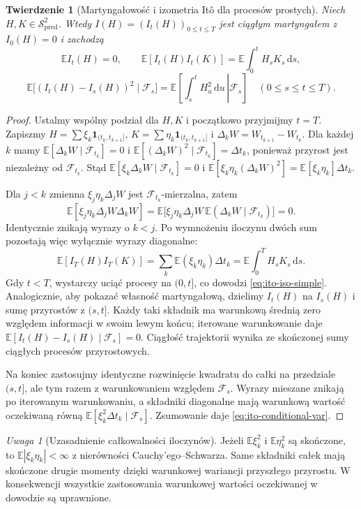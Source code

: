 \documentclass[11pt,a4paper,oneside]{report}
\numberwithin{equation}{chapter}
\theoremstyle{plain}
\newtheorem{twierdzenie}{Twierdzenie}[chapter]
\theoremstyle{definition}
\theoremstyle{remark}
\newtheorem{uwaga}{Uwaga}[chapter]
\newcommand{\E}{\mathbb{E}}
\newcommand{\calF}{\mathcal{F}}
\newcommand{\calS}{\mathcal{S}}
\newcommand{\ind}[1]{\mathbf{1}_{#1}}
\newcommand{\dd}{\mathrm{d}}
\begin{document}
\begin{twierdzenie}[Martyngałowość i izometria Itô dla procesów prostych]\label{thm:volIII:02:01}
\label{th:ito-simple-iso}
Niech $H,K\in\calS_{\mathrm{pred}}^2$. Wtedy
$I(H)=(I_t(H))_{0\le t\le T}$ jest ciągłym
martyngałem z $I_0(H)=0$ i zachodzą
\[
\E I_t(H)=0,\qquad
\E[I_t(H)I_t(K)]
=\E\int_0^tH_sK_s\,\dd s,
\tag{2.3}\label{eq:ito-iso-simple}
\]
\[
\E\big[(I_t(H)-I_s(H))^2\mid\calF_s\big]
=\E\left[\left.\int_s^tH_u^2\,\dd u\,\right|\calF_s\right]
\quad(0\le s\le t\le T).
\tag{2.4}\label{eq:ito-conditional-var}
\]
\end{twierdzenie}
\begin{proof}
Ustalmy wspólny podział dla $H,K$ i początkowo przyjmijmy
$t=T$. Zapiszmy $H=\sum\xi_k\ind{(t_k,t_{k+1}]}$,
$K=\sum\eta_k\ind{(t_k,t_{k+1}]}$ i
$\Delta_kW=W_{t_{k+1}}-W_{t_k}$.
Dla każdej $k$ mamy
$\E[\Delta_kW\mid\calF_{t_k}]=0$ i
$\E[(\Delta_kW)^2\mid\calF_{t_k}]=\Delta t_k$,
ponieważ przyrost jest niezależny od $\calF_{t_k}$.
Stąd
$\E[\xi_k\Delta_kW\mid\calF_{t_k}]=0$ i
$\E[\xi_k\eta_k(\Delta_kW)^2]=\E[\xi_k\eta_k]\Delta t_k$.

Dla $j<k$ zmienna $\xi_j\eta_k\Delta_jW$ jest
$\calF_{t_k}$-mierzalna, zatem
\[
\E[\xi_j\eta_k\Delta_jW\Delta_kW]
=\E\big[\xi_j\eta_k\Delta_jW\,
\E(\Delta_kW\mid\calF_{t_k})\big]=0.
\]
Identycznie znikają wyrazy o $k<j$.
Po wymnożeniu iloczynu dwóch sum pozostają więc
wyłącznie wyrazy diagonalne:
\[
\E[I_T(H)I_T(K)]
=\sum_k\E(\xi_k\eta_k)\Delta t_k
=\E\int_0^TH_sK_s\,\dd s.
\]
Gdy $t<T$, wystarczy uciąć procesy na $(0,t]$,
co dowodzi \eqref{eq:ito-iso-simple}. Analogicznie,
aby pokazać własność martyngałową, dzielimy $I_t(H)$
na $I_s(H)$ i sumę przyrostów z $(s,t]$. Każdy taki
składnik ma warunkową średnią zero względem informacji
w swoim lewym końcu; iterowane warunkowanie daje
$\E[I_t(H)-I_s(H)\mid\calF_s]=0$. Ciągłość trajektorii
wynika ze skończonej sumy ciągłych procesów przyrostowych.

Na koniec zastosujmy identyczne rozwinięcie kwadratu
do całki na przedziale $(s,t]$, ale tym razem z warunkowaniem
względem $\calF_s$. Wyrazy mieszane znikają po iterowanym
warunkowaniu, a składniki diagonalne mają warunkową
wartość oczekiwaną równą
$\E[\xi_k^2\Delta t_k\mid\calF_s]$.
Zsumowanie daje \eqref{eq:ito-conditional-var}.
\end{proof}

\begin{uwaga}[Uzasadnienie całkowalności iloczynów]
Jeżeli $\E\xi_k^2$ i $\E\eta_k^2$ są skończone,
to $\E|\xi_k\eta_k|<\infty$ z nierówności
Cauchy'ego--Schwarza. Same składniki całek mają skończone
drugie momenty dzięki warunkowej wariancji przyszłego
przyrostu. W konsekwencji wszystkie zastosowania
warunkowej wartości oczekiwanej w dowodzie są uprawnione.
\end{uwaga}
\end{document}
